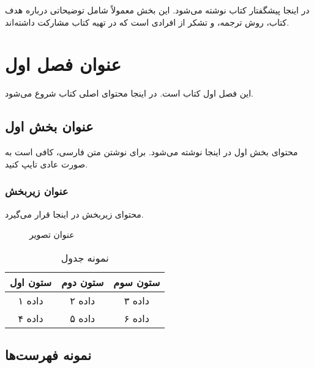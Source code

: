 \documentclass[12pt,a4paper,oneside]{book}
\begin{document}
در اینجا پیشگفتار کتاب نوشته می‌شود. این بخش معمولاً شامل توضیحاتی درباره هدف کتاب، روش ترجمه، و تشکر از افرادی است که در تهیه کتاب مشارکت داشته‌اند.

\tableofcontents



\mainmatter

\chapter{عنوان فصل اول}
\label{ch:chapter1}

این فصل اول کتاب است. در اینجا محتوای اصلی کتاب شروع می‌شود.

\section{عنوان بخش اول}
\label{sec:section1}

محتوای بخش اول در اینجا نوشته می‌شود. برای نوشتن متن فارسی، کافی است به صورت عادی تایپ کنید.

\subsection{عنوان زیربخش}

محتوای زیربخش در اینجا قرار می‌گیرد.

\begin{figure}[h]
\centering
\caption{عنوان تصویر}
\label{fig:example}
\end{figure}

\begin{table}[h]
\centering
\caption{نمونه جدول}
\label{tab:example}
\begin{tabular}{|c|c|c|}
\hline
ستون اول & ستون دوم & ستون سوم \\
\hline
داده ۱ & داده ۲ & داده ۳ \\
داده ۴ & داده ۵ & داده ۶ \\
\hline
\end{tabular}
\end{table}

\section{نمونه فهرست‌ها}
\end{document}
